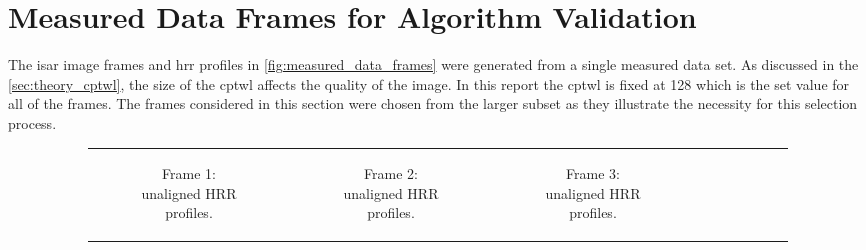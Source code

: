\documentclass[class=report,11pt,crop=false]{standalone}
\begin{document}
    
\section{Measured Data Frames for Algorithm Validation} \label{apndxA:verification_frames}
    The \gls{isar} image frames and \gls{hrr} profiles in \autoref{fig:measured_data_frames} were generated from a single measured data set. As discussed in the \autoref{sec:theory_cptwl}, the size of the \gls{cptwl} affects the quality of the image. In this report the \gls{cptwl} is fixed at 128 which is the set value for all of the frames. The frames considered in this section were chosen from the larger subset as they illustrate the necessity for this selection process. 
    \begin{figure}[H]
        \begin{minipage}{0.9\linewidth}
            \begin{figure}
                \begin{tabular}{@{}cccc@{}}
                    \begin{subfigure}{0.25\linewidth}
                        \centering
                        \resizebox{\linewidth}{!}{}
                        \caption{Frame 1: unaligned HRR profiles. \label{subfig:measured_data_frames_HRRP_2464}}
                    \end{subfigure}
                    &
                    \begin{subfigure}{0.25\linewidth}
                        \centering
                        \resizebox{\linewidth}{!}{}
                        \caption{Frame 2: unaligned HRR profiles.}
                    \end{subfigure}
                    &
                    \begin{subfigure}{0.25\linewidth}
                        \centering
                        \resizebox{\linewidth}{!}{}
                        \caption{Frame 3: unaligned HRR profiles.}
                    \end{subfigure}
                    &
                    \begin{subfigure}{0.25\linewidth}
                        \centering
                        \resizebox{\linewidth}{!}{}

\end{subfigure}
\end{tabular}
\end{figure}
\end{minipage}
\end{figure}
\end{document}

